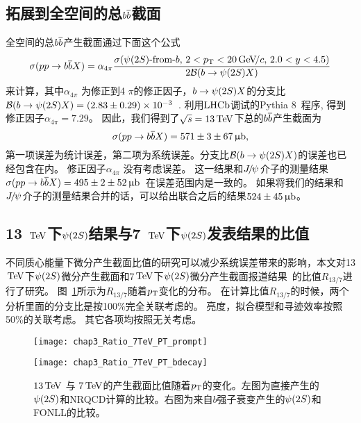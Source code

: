 \subsection{拓展到全空间的总${{b}{\overline {{b}}}}$截面}\label{extrapolation}
全空间的总${{b}{\overline {{b}}}}$产生截面通过下面这个公式
\begin{equation}
\sigma({pp}\rightarrow{\ensuremath{{b}{\overline {{b}}}}} X) = \alpha_{4 \pi}
\frac{\sigma({{\psi{(2S)}}\text{-from-}b},\, 2<\mbox{$p_{\mathrm{ T}}$}<20{\mathrm{\,Ge\kern -0.1em V\!/}c}, \, 2.0 < y < 4.5 )}{2 \mathcal{B}({b}\rightarrow{\ensuremath{\psi{(2S)}}} X)}
 \end{equation}
来计算，其中$\alpha_{4 \pi}$ 为修正到4 $\pi$的修正因子，${b}\rightarrow{\ensuremath{\psi{(2S)}}} X$的分支比$\mathcal{B}(b \rightarrow {\ensuremath{\psi{(2S)}}} X) = (2.83 \pm 0.29)\times10^{-3}$~\cite{PDG2017}. 
利用$\mbox{LHCb}$调试的Pythia 8~\cite{Sjostrand:2007gs}程序, 得到修正因子$\alpha_{4 \pi}=7.29$。
因此，我们得到了$\protect\sqrt{s}=13\mathrm{\,Te\kern -0.1em V}$下总的${{b}{\overline {{b}}}}$产生截面为
\begin{equation*}
\sigma(pp \rightarrow {\ensuremath{b}} {\ensuremath{\overline {{b}}}} X) = 571\pm 3\pm 67{\mathrm{ \,\upmu b}},
\end{equation*}
第一项误差为统计误差，第二项为系统误差。分支比${\mathcal{B}}(b \rightarrow {\ensuremath{\psi{(2S)}}} X)$的误差也已经包含在内。
修正因子$\alpha_{4 \pi }$ 没有考虑误差。
这一结果和${{J\mskip -3mu/\mskip -2mu\psi\mskip 2mu}}$介子的测量结果$\sigma(pp \rightarrow {\ensuremath{b}} {\ensuremath{\overline {{b}}}} X) = 495\pm 2\pm 52{\mathrm{ \,\upmu b}}$~\cite{LHCb-PAPER-2015-037}在误差范围内是一致的。
如果将我们的结果和${{J\mskip -3mu/\mskip -2mu\psi\mskip 2mu}}$介子的测量结果合并的话，可以给出联合之后的结果$524\pm45{\mathrm{ \,\upmu b}}$。

\subsection{13 $\mathrm{\,Te\kern -0.1em V}$下${\psi{(2S)}}$结果与7 $\mathrm{\,Te\kern -0.1em V}$下${\psi{(2S)}}$发表结果的比值}
不同质心能量下微分产生截面比值的研究可以减少系统误差带来的影响，本文对13$\mathrm{\,Te\kern -0.1em V}$下${\psi{(2S)}}$微分产生截面和7$\mathrm{\,Te\kern -0.1em V}$下${\psi{(2S)}}$微分产生截面报道结果~\cite{LHCb-PAPER-2013-067}的比值$R_{13/7}$进行了研究。
图~\ref{fig:Ratio_7TeV_PT}所示为$R_{13/7}$随着$\mbox{$p_{\mathrm{ T}}$}$变化的分布。
在计算比值$R_{13/7}$的时候，两个分析里面的分支比是按100$\%$完全关联考虑的。
亮度，拟合模型和寻迹效率按照50\%的关联考虑。
其它各项均按照无关考虑。

\begin{figure}[!tbp]
\centering
\begin{minipage}[t]{0.45\textwidth}
\centering
\texttt{[image: chap3\_Ratio\_7TeV\_PT\_prompt]}
\end{minipage}
\begin{minipage}[t]{0.45\textwidth}
\centering
\texttt{[image: chap3\_Ratio\_7TeV\_PT\_bdecay]}
\end{minipage}
\caption{$13\mathrm{\,Te\kern -0.1em V}$ 与 $7\mathrm{\,Te\kern -0.1em V}$的产生截面比值随着$\mbox{$p_{\mathrm{ T}}$}$的变化。左图为直接产生的${\psi{(2S)}}$和NRQCD计算的比较。右图为来自$b$强子衰变产生的${\psi{(2S)}}$和FONLL的比较。}
\label{fig:Ratio_7TeV_PT}
\end{figure}



